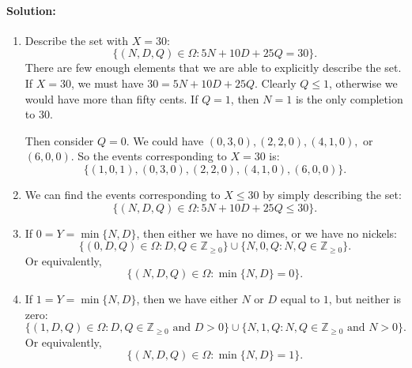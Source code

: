 \documentclass{article}
\begin{document}
\begin{enumerate}
\begin{enumerate}
        \paragraph{Solution: }
        \begin{enumerate}
            \item Describe the set with $X=30:$
                \[
                \{(N,D,Q)\in \Omega:5N+10D+25Q=30\}
                .\] 
                There are few enough elements that we are able to explicitly describe the set. If $X=30$, we must have $30=5N+10D+25Q$. Clearly  $Q\leq 1$, otherwise we would have more than fifty cents. If $Q=1$, then $N=1$ is the only completion to $30$.

                Then consider $Q=0$. We could have $(0,3,0),(2,2,0),(4,1,0),$ or $(6,0,0)$.
                So the events corresponding to  $X= 30$ is:
                \[
                    \{(1,0,1),(0,3,0),(2,2,0),(4,1,0),(6,0,0)\} 
                .\] 
            \item We can find the events corresponding to $X\leq 30$ by simply describing the set:
                 \[
                \{(N,D,Q)\in \Omega: 5N+10D+25Q\leq30\} 
                .\] 
            \item If $0=Y=\min \{N,D\} $, then either we have no dimes, or we have no nickels:
                \[
                    \{(0,D,Q)\in \Omega:D,Q\in \mathbb{Z}_{\ge 0}\} \cup \{N,0,Q:N,Q\in \mathbb{Z}_{\ge 0}\} 
                .\] 
                Or equivalently,
                \[
                \{(N,D,Q)\in \Omega:\min \{N,D\} =0\} 
                .\] 
            \item If $1=Y=\min \{N,D\} $, then we have either $N$ or $D$ equal to $1$, but neither is zero: %
                \[
                    \{(1,D,Q)\in \Omega:D,Q\in \mathbb{Z}_{\ge 0}\text{ and }D>0\} \cup \{N,1,Q:N,Q\in \mathbb{Z}_{\ge 0}\text{ and }N>0\} 
                .\] 
                Or equivalently,
                \[
                \{(N,D,Q)\in \Omega:\min \{N,D\} =1\} 
                .\] 
        \end{enumerate}
    \end{enumerate}
\end{enumerate}
\end{document}
